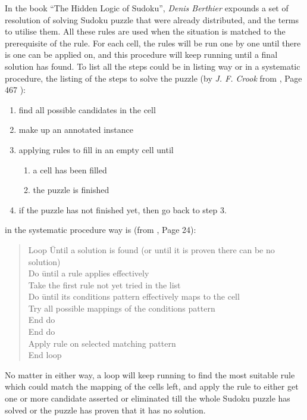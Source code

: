 \documentclass[11pt]{report}
\begin{document}
In the book ``The Hidden Logic of Sudoku\cite{Berthier2007Sudoku}'', \emph{Denis Berthier} expounds a set of resolution of solving Sudoku puzzle that were already distributed, and the terms to utilise them. All these rules are used when the situation is matched to the prerequisite of the rule. For each cell, the rules will be run one by one until there is one can be applied on, and this procedure will keep running until a final solution has found. To list all the steps could be in listing way or in a systematic procedure,
the listing of the steps to solve the puzzle (by \emph{J. F. Crook} from \cite{Crook2009Algorithm}, Page 467 ):
\begin{enumerate}
\item find all possible candidates in the cell
\item make up an annotated instance
\item applying rules to fill in an empty cell until
\begin{enumerate}
\item a cell has been filled
\item the puzzle is finished
\end{enumerate}
\item if the puzzle has not finished yet, then go back to step 3.
\end{enumerate}
in the systematic procedure way is (from \cite{Berthier2007Sudoku}, Page 24):
\begin{quote}
\begin{tabbing}
Loop \=Until  a solution is found (or until it is proven there can be no solution)\\
\>Do \=until a rule applies  effectively \\
\>\>Take the first rule not yet tried in the list \\
\>\>Do \=until its conditions pattern effectively maps to the cell \\
\>\>\>Try all possible mappings of the conditions pattern \\
\>\>End do\\
\>End do\\
\>Apply rule on selected matching pattern\\
End loop\\
\end{tabbing}
\end{quote}
No matter in either way, a loop will keep running to find the most suitable rule which could match the mapping of the cells left, and apply the rule to either get one or more candidate asserted or eliminated till the whole Sudoku puzzle has solved or the puzzle has proven that it has no solution.
\end{document}
